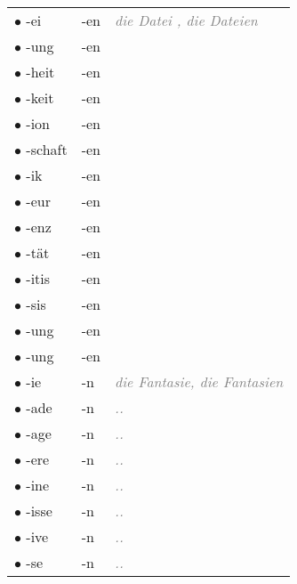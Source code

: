 \documentclass[a4paper,twocolumn,10pt]{article}
\begin{document}
\begin{xtabular}{lll}

		 $\bullet$  -ei    & -en & \textcolor{gray}{ \textit{die Datei , die Dateien} }\\
		 $\bullet$ -ung    & -en & \textcolor{gray}{ \textit{} }\\
		 $\bullet$ -heit   & -en & \textcolor{gray}{ \textit{} }\\
		 $\bullet$ -keit   & -en & \textcolor{gray}{ \textit{} }\\
		 $\bullet$ -ion    & -en & \textcolor{gray}{ \textit{} }\\
		 $\bullet$ -schaft & -en & \textcolor{gray}{ \textit{} }\\
		 $\bullet$ -ik     & -en & \textcolor{gray}{ \textit{} }\\
		 $\bullet$ -eur    & -en & \textcolor{gray}{ \textit{} }\\
		 $\bullet$ -enz    & -en & \textcolor{gray}{ \textit{} }\\
		 $\bullet$ -tät    & -en & \textcolor{gray}{ \textit{} }\\
		 $\bullet$ -itis   & -en & \textcolor{gray}{ \textit{} }\\
		 $\bullet$ -sis    & -en & \textcolor{gray}{ \textit{} }\\
		 $\bullet$ -ung    & -en & \textcolor{gray}{ \textit{} }\\
		 $\bullet$ -ung    & -en & \textcolor{gray}{ \textit{} }\\

		\midrule
		 $\bullet$ -ie  & -n & \textcolor{gray}{ \textit{die Fantasie, die Fantasien} }\\
		 $\bullet$ -ade  & -n & \textcolor{gray}{ \textit{..} }\\
		 $\bullet$ -age  & -n & \textcolor{gray}{ \textit{..} }\\
		 $\bullet$ -ere  & -n & \textcolor{gray}{ \textit{..} }\\
		 $\bullet$ -ine  & -n & \textcolor{gray}{ \textit{..} }\\
		 $\bullet$ -isse & -n & \textcolor{gray}{ \textit{..} }\\
		 $\bullet$ -ive  & -n & \textcolor{gray}{ \textit{..} }\\
		 $\bullet$ -se   & -n & \textcolor{gray}{ \textit{..} }\\


\end{xtabular}
\end{document}

